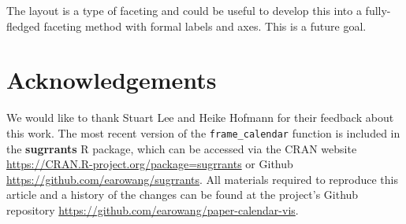 \documentclass[12pt]{article}
\begin{document}
The layout is a type of faceting and could be useful to develop this
into a fully-fledged faceting method with formal labels and axes. This
is a future goal.

\hypertarget{acknowledgements}{%
\section*{Acknowledgements}\label{acknowledgements}}

We would like to thank Stuart Lee and Heike Hofmann for their feedback
about this work. The most recent version of the \texttt{frame\_calendar}
function is included in the \textbf{sugrrants} R package, which can be
accessed via the CRAN website
\url{https://CRAN.R-project.org/package=sugrrants} or Github
\url{https://github.com/earowang/sugrrants}. All materials required to
reproduce this article and a history of the changes can be found at the
project's Github repository
\url{https://github.com/earowang/paper-calendar-vis}.



\end{document}
